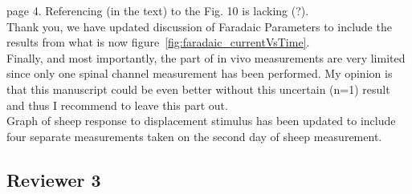 \documentclass[journal, a4paper]{IEEEtran}
\begin{document}
{page 4. Referencing (in the text) to the Fig. 10 is lacking (?).\\
{\color{OliveGreen}
    Thank you, we have updated discussion of Faradaic Parameters to include the results from what is now figure~\ref{fig:faradaic_currentVsTime}.
}\\

Finally, and most importantly, the part of in vivo measurements are very limited since only one spinal channel measurement has been performed. My opinion is that this manuscript could be even better without this uncertain (n=1) result and thus I recommend to leave this part out.\\
{\color{OliveGreen}
    Graph of sheep response to displacement stimulus has been updated to include four separate measurements taken on the second day of sheep measurement. 
}\\
}




\subsection*{Reviewer 3}
\end{document}
